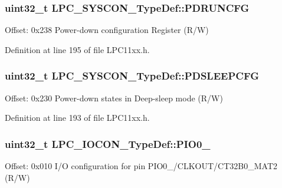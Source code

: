 \subsubsection[{\texorpdfstring{P\+D\+R\+U\+N\+C\+FG}{PDRUNCFG}}]{ uint32\+\_\+t L\+P\+C\+\_\+\+S\+Y\+S\+C\+O\+N\+\_\+\+Type\+Def\+::\+P\+D\+R\+U\+N\+C\+FG}\hypertarget{group___l_p_c11xx___definitions_gaabb6707dad69fdc2c8eb0b10524902dd}{}\label{group___l_p_c11xx___definitions_gaabb6707dad69fdc2c8eb0b10524902dd}
Offset\+: 0x238 Power-\/down configuration Register (R/W) 

Definition at line 195 of file L\+P\+C11xx.\+h.

\subsubsection[{\texorpdfstring{P\+D\+S\+L\+E\+E\+P\+C\+FG}{PDSLEEPCFG}}]{ uint32\+\_\+t L\+P\+C\+\_\+\+S\+Y\+S\+C\+O\+N\+\_\+\+Type\+Def\+::\+P\+D\+S\+L\+E\+E\+P\+C\+FG}\hypertarget{group___l_p_c11xx___definitions_ga6212507a2117dbb6d82fc184998e3c2c}{}\label{group___l_p_c11xx___definitions_ga6212507a2117dbb6d82fc184998e3c2c}
Offset\+: 0x230 Power-\/down states in Deep-\/sleep mode (R/W) 

Definition at line 193 of file L\+P\+C11xx.\+h.

\subsubsection[{\texorpdfstring{P\+I\+O0\+\_\+1}{PIO0_1}}]{ uint32\+\_\+t L\+P\+C\+\_\+\+I\+O\+C\+O\+N\+\_\+\+Type\+Def\+::\+P\+I\+O0\+\_}\hypertarget{group___l_p_c11xx___definitions_ga1be433c8d0d4b04d48d7435990640b82}{}\label{group___l_p_c11xx___definitions_ga1be433c8d0d4b04d48d7435990640b82}
Offset\+: 0x010 I/O configuration for pin P\+I\+O0\+\_/\+C\+L\+K\+O\+U\+T/\+C\+T32\+B0\+\_\+\+M\+A\+T2 (R/W) 

